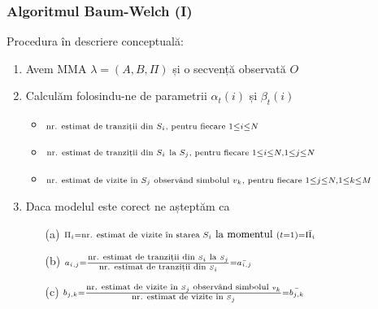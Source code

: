 \begin{frame}[fragile, t]
	\frametitle{Algoritmul Baum-Welch (I)}
	Procedura în descriere conceptuală:	
	\vspace*{0.25em}
	\footnotesize{
	\begin{enumerate}
		\item Avem MMA $\lambda = (A, B, \Pi)$ și o secvență observată $O$%
		\vspace*{0.25em}
		\pause
		
		\item Calculăm folosindu-ne de parametrii $\alpha_t(i)$ și $\beta_t(i)$			
			\begin{itemize}
				\item	$\scriptstyle 	\mbox{\scriptsize{nr. estimat de tranziții din }} S_i 
										\mbox{\scriptsize{, pentru fiecare} } 
				1 \le i \le N$%
				\vspace*{0.5em}
				\item	$\scriptstyle 	\mbox{\scriptsize{nr. estimat de tranziții din }} S_i 
										\mbox{ \scriptsize{la }} S_j 
										\mbox{\scriptsize{, pentru fiecare }} 1 \le i \le N, 1 \le j \le N$%
				\vspace*{0.5em}
				\item 	$\scriptstyle	\mbox{\scriptsize{nr. estimat de vizite în }} S_j 
										\mbox{\scriptsize{ observând simbolul }} v_k
										\mbox{\scriptsize{, pentru fiecare }} 1 \le j \le N, 1 \le k \le M$%
			\end{itemize}
		\vspace*{0.25em}		
		\pause
		
		\item Daca modelul este corect ne așteptăm ca
			\begin{enumerate}
				\item[(a)] $\scriptstyle \Pi_i = \mbox{{\scriptsize nr. estimat de vizite în starea }} 
													S_i \mbox{\small{ la momentul }} (t=1) = \bar{\Pi_i} $%
				\vspace*{0.5em}
				\item[(b)] $\scriptstyle a_{i,j} = \frac{\mbox{\scriptsize{nr. estimat de tranziții din }} S_i 
											\mbox{\scriptsize{ la }} S_j}
											{\mbox{\scriptsize{nr. estimat de tranziții din }} S_i} = \bar{a_{i,j}}$%
				\vspace*{0.5em}
				\item[(c)] $\scriptstyle b_{j,k} = \frac{\mbox{\scriptsize{nr. estimat de vizite în }} S_j 
											\mbox{\scriptsize{ observând simbolul }} v_k}
											{\mbox{\scriptsize{nr. estimat de vizite în }} S_j} = \bar{b_{j,k}}$%
			\end{enumerate}
		\vspace*{0.25em}		
		\pause
		

\end{enumerate}}
\end{frame}
